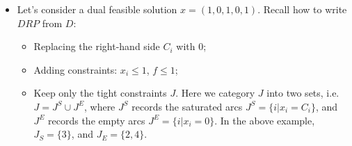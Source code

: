 \documentclass[mathserif]{beamer}
\begin{document}
{\begin{itemize}
\begin{figure}
\begin{tikzpicture}[scale=1, auto,swap]
   \end{tikzpicture}
\end{figure}
\item Let's consider a dual feasible solution ${x}=(1, 0, 1, 0, 1)$. Recall how to write $DRP$ from $D$:
	\begin{itemize}
		\item Replacing the right-hand side $C_i$ with $0$; 
		\item Adding constraints: $x_i\leq 1$,  $f\leq 1$; 
		\item Keep only the tight constraints $J$. Here we category $J$ into two sets, i.e. $J = J^S \cup J^E$, where $J^S$ records the saturated arcs $J^S=\{i | x_i = C_i \}$, and $J^E$ records the empty arcs $J^E=\{i | x_i = 0 \}$. In the above example, $J_S=\{3\}$, and $J_E=\{2, 4\}$. 
		
	\end{itemize}
\end{itemize}
} 
\end{document}
